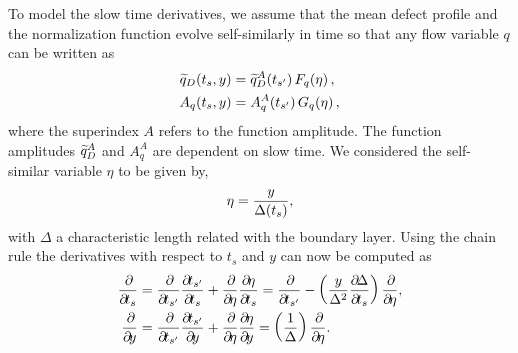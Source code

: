 {To model the slow time derivatives, we assume that the mean defect profile and
the normalization function evolve self-similarly in time so
that any flow variable $q$ can be written as
%
\begin{align}
\label{eqn:similarMean}
\widetilde{q}_D \! \left(t_s, y\right) &=
       \widetilde{q}_D^A \! \left(t_{s'}\right) F_q \! \left(\eta\right), \\
\label{eqn:similarRms}
A_q \! \left(t_s, y\right) &=
       A_q^A \! \left(t_{s'}\right)   G_q \! \left(\eta\right),
\end{align}
%
where the superindex $A$ refers to the function amplitude.
%
The function amplitudes $\widetilde{q}_D^A$ and $A_q^A$ are dependent on slow
time.
%
We considered the self-similar variable $\eta$ to be given by,
%
\begin{equation}
\eta = \frac{y}{\Delta \! \left(t_s\right)},
\end{equation}
%
with $\Delta$ a characteristic length related with the boundary layer.
%
Using the chain rule the derivatives with respect to $t_s$ and $y$
can now be computed as
%
\begin{align}
\label{eqn:similarTsDerivative}
\pp{}{t_s}
     &=
      \pp{}{t_{s'}} \pp{t_{s'}}{t_s} + \pp{}{\eta} \pp{\eta}{t_s}
      =
      \pp{}{t_{s'}} - \left(\frac{y}{\Delta^2} \pp{\Delta}{t_s}\right) \pp{}{\eta}, \\
\label{eqn:similarYDerivative}
\pp{}{y}
     &=
      \pp{}{t_{s'}} \pp{t_{s'}}{y} + \pp{}{\eta} \pp{\eta}{y}
      =
      \left(\frac{1}{\Delta}\right) \pp{}{\eta}.
\end{align}
%

}
